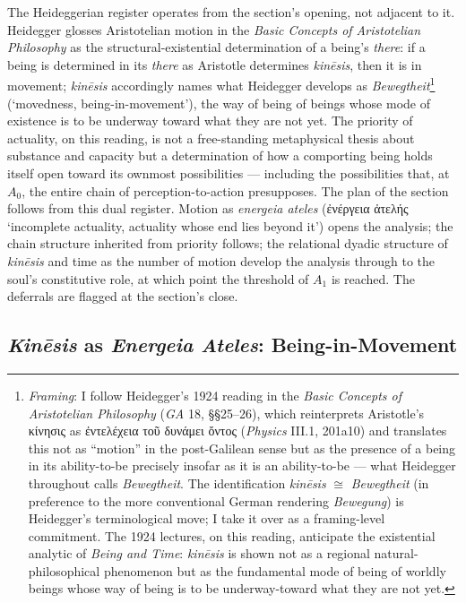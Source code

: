\documentclass{article}
\newcommand{\gk}[1]{{\greekfont #1}}
\begin{document}
The Heideggerian register operates from the section's opening, not adjacent to it. Heidegger glosses Aristotelian motion in the \textit{Basic Concepts of Aristotelian Philosophy} as the structural-existential determination of a being's \textit{there}: if a being is determined in its \textit{there} as Aristotle determines \textit{kinēsis}, then it is in movement; \textit{kinēsis} accordingly names what Heidegger develops as \textit{Bewegtheit}\footnote{\textit{Framing}: I follow Heidegger's 1924 reading in the \textit{Basic Concepts of Aristotelian Philosophy} (\textit{GA} 18, §§25--26), which reinterprets Aristotle's κίνησις as ἐντελέχεια τοῦ δυνάμει ὄντος (\textit{Physics} III.1, 201a10) and translates this not as ``motion'' in the post-Galilean sense but as the presence of a being in its ability-to-be precisely insofar as it is an ability-to-be --- what Heidegger throughout calls \textit{Bewegtheit}. The identification \textit{kin\=esis} $\cong$ \textit{Bewegtheit} (in preference to the more conventional German rendering \textit{Bewegung}) is Heidegger's terminological move; I take it over as a framing-level commitment. The 1924 lectures, on this reading, anticipate the existential analytic of \textit{Being and Time}: \textit{kin\=esis} is shown not as a regional natural-philosophical phenomenon but as the fundamental mode of being of worldly beings whose way of being is to be underway-toward what they are not yet.} (`movedness, being-in-movement'), the way of being of beings whose mode of existence is to be underway toward what they are not yet. The priority of actuality, on this reading, is not a free-standing metaphysical thesis about substance and capacity but a determination of how a comporting being holds itself open toward its ownmost possibilities --- including the possibilities that, at $A_0$, the entire chain of perception-to-action presupposes. The plan of the section follows from this dual register. Motion as \textit{energeia ateles} (\gk{ἐνέργεια ἀτελής} `incomplete actuality, actuality whose end lies beyond it') opens the analysis; the chain structure inherited from priority follows; the relational dyadic structure of \textit{kinēsis} and time as the number of motion develop the analysis through to the soul's constitutive role, at which point the threshold of $A_1$ is reached. The deferrals are flagged at the section's close.

\subsection{\textit{Kinēsis} as \textit{Energeia Ateles}: Being-in-Movement}
\end{document}
